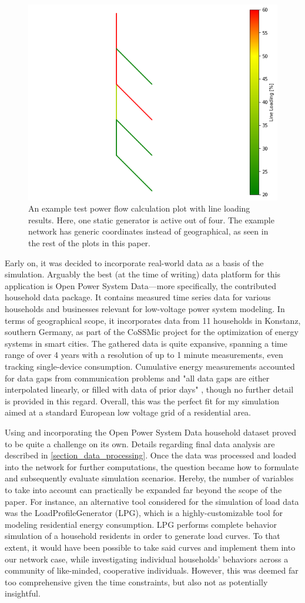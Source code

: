 \documentclass[a4paper,10pt]{report}
\begin{document}
\begin{figure}[htpb]
	\centering
	\includegraphics[width=0.46\linewidth]{test_network}
	\caption{An example test power flow calculation plot with line loading results. Here, one static generator is active out of four. The example network has generic coordinates instead of geographical, as seen in the rest of the plots in this paper.}
	\label{test_network}
\end{figure}

Early on, it was decided to incorporate real-world data as a basis of the simulation. Arguably the best (at the time of writing) data platform for this application is Open Power System Data---more specifically, the contributed household data package. It contains measured time series data for various households and businesses relevant for low-voltage power system modeling. In terms of geographical scope, it incorporates data from 11 households in Konstanz, southern Germany, as part of the CoSSMic project for the optimization of energy systems in smart cities. The gathered data is quite expansive, spanning a time range of over 4 years with a resolution of up to 1 minute measurements, even tracking single-device consumption. Cumulative energy measurements accounted for data gaps from communication problems and "all data gaps are either interpolated linearly, or filled with data of prior days" \cite{OpenPowerSystemData}, though no further detail is provided in this regard. Overall, this was the perfect fit for my simulation aimed at a standard European low voltage grid of a residential area.

Using and incorporating the Open Power System Data household dataset proved to be quite a challenge on its own. Details regarding final data analysis are described in \cref{section_data_processing}. Once the data was processed and loaded into the network for further computations, the question became how to formulate and subsequently evaluate simulation scenarios. Hereby, the number of variables to take into account can practically be expanded far beyond the scope of the paper. For instance, an alternative tool considered for the simulation of load data was the LoadProfileGenerator (LPG), which is a highly-customizable tool for modeling residential energy consumption. LPG performs complete behavior simulation of a household residents in order to generate load curves. To that extent, it would have been possible to take said curves and implement them into our network case, while investigating individual households' behaviors across a community of like-minded, cooperative individuals. However, this was deemed far too comprehensive given the time constraints, but also not as potentially insightful.
\end{document}
